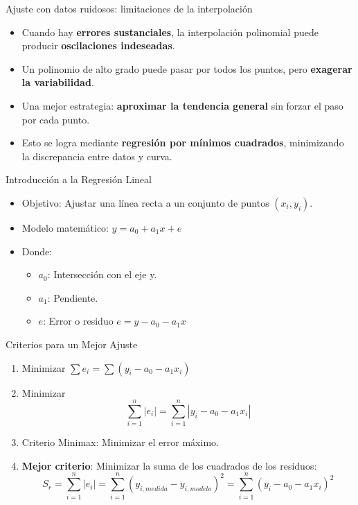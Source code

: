 \documentclass[main.tex]{subfiles}
\begin{document}
\begin{frame}{Ajuste con datos ruidosos: limitaciones de la interpolación}
\begin{itemize}
  \item Cuando hay \textbf{errores sustanciales}, la interpolación polinomial puede producir \textbf{oscilaciones indeseadas}.
  \item Un polinomio de alto grado puede pasar por todos los puntos, pero \textbf{exagerar la variabilidad}.
  \item Una mejor estrategia: \textbf{aproximar la tendencia general} sin forzar el paso por cada punto.
  \item Esto se logra mediante \textbf{regresión por mínimos cuadrados}, minimizando la discrepancia entre datos y curva.
\end{itemize}
\end{frame}

\begin{frame}{Introducción a la Regresión Lineal}
  \begin{itemize}
    \item Objetivo: Ajustar una línea recta a un conjunto de puntos \((x_i, y_i)\).
    \item Modelo matemático: \( y = a_0 + a_1x + e \)
    \item Donde:
    \begin{itemize}
      \item \(a_0\): Intersección con el eje y.
      \item \(a_1\): Pendiente.
      \item \(e\): Error o residuo \(e = y - a_0 - a_1x\)
    \end{itemize}
  \end{itemize}
\end{frame}

\begin{frame}{Criterios para un Mejor Ajuste}
  \begin{enumerate}
    \item Minimizar \( \sum e_i = \sum (y_i - a_0 - a_1x_i) \)
    \item Minimizar \[\sum_{i=1}^{n}  |e_i| = \sum_{i=1}^{n} |y_i - a_0 - a_1x_i| \]
    \item Criterio Minimax: Minimizar el error máximo.
    \item \textbf{Mejor criterio}: Minimizar la suma de los cuadrados de los residuos:
    \[
      S_r =\sum_{i=1}^{n}  |e_i| =\sum_{i=1}^n (y_{i,medida}-y_{i,modelo})^2 =\sum_{i=1}^n (y_i - a_0 - a_1x_i)^2
    \]
  \end{enumerate}
\end{frame}
\end{document}

